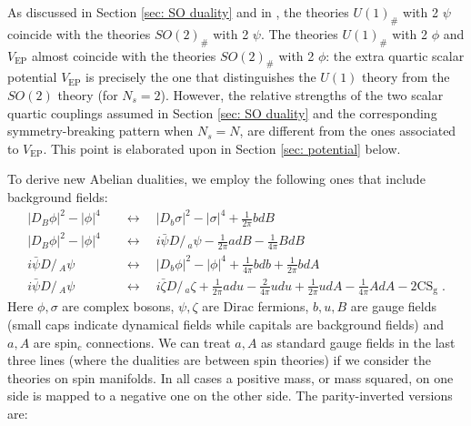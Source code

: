\documentclass[a4paper, 12pt]{article}
\numberwithin{equation}{section}
\newcommand{\Dslash}{D\!\!\!\!\slash\,}
\begin{document}
As discussed in Section \ref{sec: SO duality} and in \cite{Aharony:2016jvv}, the theories $U(1)_\#$ with 2 $\psi$ coincide with the theories $SO(2)_\#$ with 2 $\psi$. The theories $U(1)_\#$ with 2 $\phi$ and $V_\text{EP}$ almost coincide with the theories $SO(2)_\#$ with 2 $\phi$: the extra quartic scalar potential $V_\text{EP}$ is precisely the one that distinguishes the $U(1)$ theory from the $SO(2)$ theory (for $N_s=2$). However, the relative strengths of the two scalar quartic couplings assumed in Section \ref{sec: SO duality} and the corresponding symmetry-breaking pattern when $N_s=N$, are different from the ones associated to $V_\text{EP}$. This point is elaborated upon in Section \ref{sec: potential} below.

To derive new Abelian dualities, we employ the following ones \cite{Seiberg:2016gmd} that include background fields:
\begin{subequations}
\label{Abelian dualities with background}
\begin{align}
\label{Abdu-a}
|D_B\phi|^2 - |\phi|^4 \quad&\longleftrightarrow\quad |D_b\sigma|^2 - |\sigma|^4 + \frac1{2\pi} bdB \\
\label{Abdu-b}
|D_B\phi|^2 - |\phi|^4 \quad&\longleftrightarrow\quad i \bar\psi \Dslash_a \psi - \frac1{2\pi} adB - \frac1{4\pi} BdB \\
\label{Abdu-c}
i\bar\psi \Dslash_A \psi \quad&\longleftrightarrow\quad |D_b\phi|^2 - |\phi|^4 + \frac1{4\pi} bdb + \frac1{2\pi}bdA \\
\label{Abdu-d}
i\bar\psi \Dslash_A \psi \quad&\longleftrightarrow\quad i \bar\zeta \Dslash_a \zeta + \frac1{2\pi} adu - \frac2{4\pi} udu + \frac1{2\pi} udA - \frac1{4\pi} AdA - 2\text{CS}_\text{g} \;.
\end{align}
\end{subequations}
Here $\phi,\sigma$ are complex bosons, $\psi, \zeta$ are Dirac fermions, $b,u,B$ are gauge fields (small caps indicate dynamical fields while capitals are background fields) and $a,A$ are spin$_c$ connections. We can treat $a,A$ as standard gauge fields in the last three lines (where the dualities are between spin theories) if we consider the theories on spin manifolds. In all cases a positive mass, or mass squared, on one side is mapped to a negative one on the other side. The parity-inverted versions are:
\end{document}

